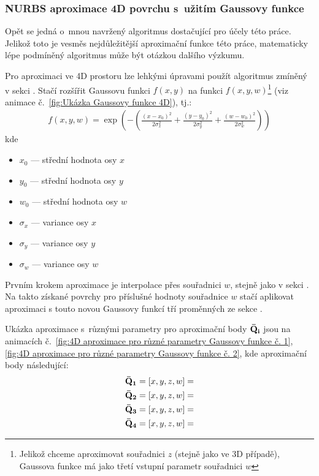 \subsubsection{NURBS aproximace 4D povrchu s~užitím Gaussovy funkce}\label{section: gauss surface approximation 4D}
Opět se jedná o~mnou navržený algoritmus dostačující pro účely této práce. Jelikož toto je vesměs nejdůležitější aproximační funkce této práce, matematicky lépe podmíněný algoritmus může být otázkou dalšího výzkumu.\par
Pro aproximaci ve 4D prostoru lze lehkými úpravami použít algoritmus zmíněný v
sekci . Stačí rozšířit
Gaussovu funkci $f(x,y)$ na funkci $f(x,y,w)$\footnote{Jelikož chceme
    aproximovat souřadnici $z$ (stejně jako ve 3D případě), Gaussova funkce má jako
    třetí vstupní parametr souřadnici $w$} (viz animace č.~\ref{fig:Ukázka Gaussovy
    funkce 4D}), tj.:
\begin{align}
    f(x,y,w) = \exp\left(-\left(\frac{(x - x_0)^2}{2\sigma_x^2} + \frac{(y - y_0)^2}{2\sigma_y^2} + \frac{(w - w_0)^2}{2\sigma_w^2} \right)\right)
\end{align}
kde
\begin{itemize}
    \item $x_0$ --- střední hodnota osy $x$
    \item $y_0$ --- střední hodnota osy $y$
    \item $w_0$ --- střední hodnota osy $w$
    \item $\sigma_x$ --- variance osy $x$
    \item $\sigma_y$ --- variance osy $y$
    \item $\sigma_w$ --- variance osy $w$
\end{itemize}
Prvním krokem aproximace je interpolace přes souřadnici $w$, stejně jako
v sekci . Na takto získané povrchy
pro příslušné hodnoty souřadnice $w$ stačí aplikovat aproximaci s touto novou Gaussovy funkcí tří proměnných ze sekce .
\par
Ukázka aproximace s~různými parametry pro aproximační body $\bf{\bar{Q}}_i$
jsou na animacích č.~\ref{fig:4D aproximace pro různé parametry Gaussovy funkce č. 1},
\ref{fig:4D aproximace pro různé parametry Gaussovy funkce č. 2}, kde aproximační body následující:
\begin{align}
    \bf{\bar{Q}}_1 & = [x, y, z, w] =  \\
    \bf{\bar{Q}}_2 & = [x, y, z, w]=   \\
    \bf{\bar{Q}}_3 & = [x, y, z, w]=   \\
    \bf{\bar{Q}}_4 & = [x, y, z, w] = 
\end{align}
